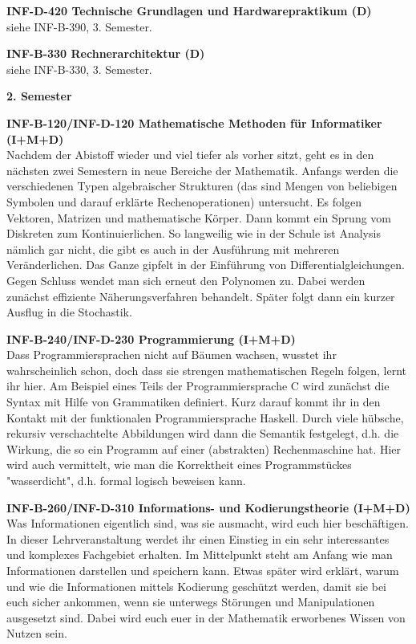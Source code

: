 \textbf{INF-D-420 Technische Grundlagen und Hardwarepraktikum (D)} \\
siehe INF-B-390, 3. Semester.

\textbf{INF-B-330 Rechnerarchitektur (D)} \\
siehe INF-B-330, 3. Semester.

\textbf{2. Semester}

\textbf{INF-B-120/INF-D-120 Mathematische Methoden für Informatiker (I+M+D)} \\
Nachdem der Abistoff wieder und viel tiefer als vorher sitzt, geht es in den nächsten zwei Semestern in neue Bereiche der Mathematik.
Anfangs werden die verschiedenen Typen algebraischer Strukturen (das sind Mengen von beliebigen Symbolen und darauf erklärte Rechenoperationen) untersucht.
Es folgen Vektoren, Matrizen und mathematische Körper.
Dann kommt ein Sprung vom Diskreten zum Kontinuierlichen.
So langweilig wie in der Schule ist Analysis nämlich gar nicht, die gibt es auch in der Ausführung mit mehreren Veränderlichen.
Das Ganze gipfelt in der Einführung von Differentialgleichungen.
Gegen Schluss wendet man sich erneut den Polynomen zu.
Dabei werden zunächst effiziente Näherungsverfahren behandelt.
Später folgt dann ein kurzer Ausflug in die Stochastik.

\textbf{INF-B-240/INF-D-230 Programmierung (I+M+D)} \\
Dass Programmiersprachen nicht auf Bäumen wachsen, wusstet ihr wahrscheinlich schon, doch dass sie strengen mathematischen Regeln folgen, lernt ihr hier.
Am Beispiel eines Teils der Programmiersprache C wird zunächst die Syntax mit Hilfe von Grammatiken definiert.
Kurz darauf kommt ihr in den Kontakt mit der funktionalen Programmiersprache Haskell.
Durch viele hübsche, rekursiv verschachtelte Abbildungen wird dann die Semantik festgelegt, d.h. die Wirkung, die so ein Programm auf einer (abstrakten) Rechenmaschine hat.
Hier wird auch vermittelt, wie man die Korrektheit eines Programmstückes "wasserdicht", d.h. formal logisch beweisen kann.

\textbf{INF-B-260/INF-D-310 Informations- und Kodierungstheorie (I+M+D)} \\
Was Informationen eigentlich sind, was sie ausmacht, wird euch hier beschäftigen.
In dieser Lehrveranstaltung werdet ihr einen Einstieg in ein sehr interessantes und komplexes Fachgebiet erhalten.
Im Mittelpunkt steht am Anfang wie man Informationen darstellen und speichern kann.
Etwas später wird erklärt, warum und wie die Informationen mittels Kodierung geschützt werden, damit sie bei euch sicher ankommen, wenn sie unterwegs Störungen und Manipulationen ausgesetzt sind.
Dabei wird euch euer in der Mathematik erworbenes Wissen von Nutzen sein.


